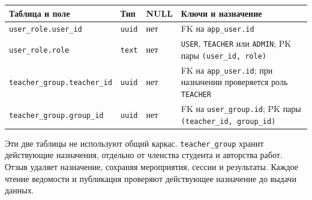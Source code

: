 \documentclass[12pt,a4paper]{article}
\newcounter{none} %
\begin{document}
\hypertarget{таблицы-user_role-и-teacher_group}{}

{\def\LTcaptype{none} %
\begin{longtable}[]{@{}
  >{\raggedright\arraybackslash}p{}
  >{\raggedright\arraybackslash}p{}
  >{\raggedright\arraybackslash}p{}
  >{\raggedright\arraybackslash}p{}@{}}
\toprule\noalign{}
\begin{minipage}[b]{\linewidth}\raggedright
Таблица и поле
\end{minipage} & \begin{minipage}[b]{\linewidth}\raggedright
Тип
\end{minipage} & \begin{minipage}[b]{\linewidth}\raggedright
NULL
\end{minipage} & \begin{minipage}[b]{\linewidth}\raggedright
Ключи и назначение
\end{minipage} \\
\midrule\noalign{}
\endhead
\bottomrule\noalign{}
\endlastfoot
\texttt{user\_\allowbreak{}role.\allowbreak{}user\_\allowbreak{}id} & \texttt{uuid} & нет & FK на \texttt{app\_\allowbreak{}user.\allowbreak{}id} \\
\texttt{user\_\allowbreak{}role.\allowbreak{}role} & \texttt{text} & нет & \texttt{USER}, \texttt{TEACHER} или \texttt{ADMIN}; PK пары \texttt{(user\_\allowbreak{}id, role)} \\
\texttt{teacher\_\allowbreak{}group.\allowbreak{}teacher\_\allowbreak{}id} & \texttt{uuid} & нет & FK на \texttt{app\_\allowbreak{}user.\allowbreak{}id}; при назначении проверяется роль \texttt{TEACHER} \\
\texttt{teacher\_\allowbreak{}group.\allowbreak{}group\_\allowbreak{}id} & \texttt{uuid} & нет & FK на \texttt{user\_\allowbreak{}group.\allowbreak{}id}; PK пары \texttt{(teacher\_\allowbreak{}id, group\_\allowbreak{}id)} \\
\end{longtable}
}

Эти две таблицы не используют общий каркас. \texttt{teacher\_\allowbreak{}group} хранит действующие назначения, отдельно от членства студента и авторства работ. Отзыв удаляет назначение, сохраняя мероприятия, сессии и результаты. Каждое чтение ведомости и публикация проверяют действующее назначение до выдачи данных.
\end{document}
